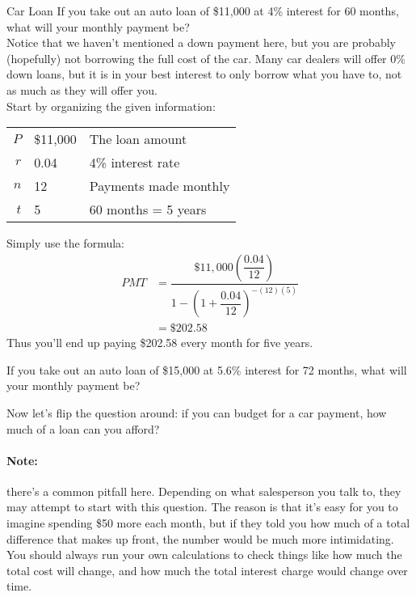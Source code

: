 \begin{example}[https://www.youtube.com/watch?v=RVUWTbil3fQ&list=PLfmpjsIzhztsZtnb7HnXrQ8SLoiOCIcAM&index=34]{Car Loan}
If you take out an auto loan of \$11,000 at 4\% interest for 60 months, what will your monthly payment be?\\

\sol
Notice that we haven't mentioned a down payment here, but you are probably (hopefully) not borrowing the full cost of the car.  Many car dealers will offer 0\% down loans, but it is in your best interest to only borrow what you have to, not as much as they will offer you.\\

Start by organizing the given information:
\begin{center}
\begin{tabular}{r l l}
$P$ & \$11,000 & The loan amount\\
$r$ & 0.04 & 4\% interest rate\\
$n$ & 12 & Payments made monthly\\
$t$ & 5 & 60 months = 5 years
\end{tabular}
\end{center}

Simply use the formula:
\begin{align*}
PMT &= \dfrac{\$11,000\left(\dfrac{0.04}{12}\right)}{1-\left(1+\dfrac{0.04}{12}\right)^{-(12)(5)}}\\
&= \boxed{\$202.58}
\end{align*}
Thus you'll end up paying \$202.58 every month for five years.
\end{example}

\begin{try}
If you take out an auto loan of \$15,000 at 5.6\% interest for 72 months, what will your monthly payment be?
\end{try}

Now let's flip the question around: if you can budget for a car payment, how much of a loan can you afford?
\vfill

\paragraph{Note:} there's a common pitfall here.  Depending on what salesperson you talk to, they may attempt to start with this question.  The reason is that it's easy for you to imagine spending \$50 more each month, but if they told you how much of a total difference that makes up front, the number would be much more intimidating.  You should always run your own calculations to check things like how much the total cost will change, and how much the total interest charge would change over time.
\vfill
\pagebreak

